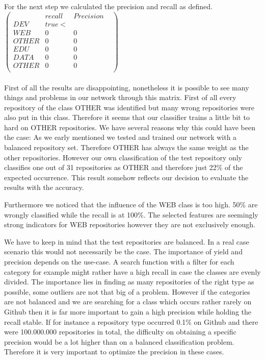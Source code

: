 \documentclass[paper=A4,pagesize=auto,12pt,headinclude=true,footinclude=true,BCOR=0mm,DIV=calc]{scrartcl}
\begin{document}
	For the next step we calculated the precision and recall as defined.
	\\
		$\begin{pmatrix}
		    & recall & Precision \\
		   \hline
		DEV & true< &\\
		 WEB&  0 & 0 \\
		 OTHER& 0 & 0 \\
		 EDU& 0 & 0 & \\
		  DATA& 0 & 0 \\
		  OTHER& 0 & 0 \\
		\end{pmatrix}$
	\\
	\\
	First of all the results are disappointing, nonetheless it is possible to see many things and problems in our network through this matrix. First of all every repository of the class OTHER was identified but many wrong repositories were also put in this class. Therefore it seems that our classifier trains a little bit to hard on OTHER repositories. We have several reasons why this could have been the case: As we early mentioned we tested and trained our network with a balanced repository set. Therefore OTHER has always the same weight as the other repositories. However our own classification of the test repository only classifies one out of 31 repositories as OTHER and therefore just 22\% of the expected occurrence. This result somehow reflects our decision to evaluate the results with the accuracy.\cite{EvaluateNetwork}
	
	Furthermore we noticed that the influence of the WEB class is too high. 50\% are wrongly classified while the recall is at 100\%. The selected features are seemingly strong indicators for WEB repositories however they are not exclusively enough.
	
	We have to keep in mind that the test repositories are balanced. In a real case scenario this would not necessarily be the case. The importance of yield and precision depends on the use-case. A search function with a filter for each category for example might rather have a high recall in case the classes are evenly divided. The importance lies in finding as many repositories of the right type as possible, some outliers are not that big of a problem. However if the categories are not balanced and we are searching for a class which occurs rather rarely on Github then it is far more important to gain a high precision while holding the recall stable. If for instance a repository type occurred 0.1\% on Github and there were 100.000.000 repositories in total, the difficulty on obtaining a specific precision would be a lot higher than on a balanced classification problem. Therefore it is very important to optimize the precision in these cases.
	
\end{document}
